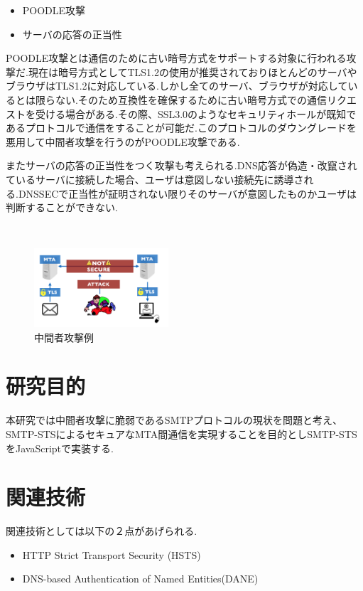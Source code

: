 \documentclass[a4j,10pt]{jsarticle}
\begin{document}
\begin{itemize}
\item POODLE攻撃 
\item サーバの応答の正当性
\end{itemize}

POODLE攻撃とは通信のために古い暗号方式をサポートする対象に行われる攻撃だ.現在は暗号方式としてTLS1.2の使用が推奨されておりほとんどのサーバやブラウザはTLS1.2に対応している.しかし全てのサーバ、ブラウザが対応しているとは限らない.そのため互換性を確保するために古い暗号方式での通信リクエストを受ける場合がある.その際、SSL3.0のようなセキュリティホールが既知であるプロトコルで通信をすることが可能だ.このプロトコルのダウングレードを悪用して中間者攻撃を行うのがPOODLE攻撃である.

またサーバの応答の正当性をつく攻撃も考えられる.DNS応答が偽造・改竄されているサーバに接続した場合、ユーザは意図しない接続先に誘導される.DNSSECで正当性が証明されない限りそのサーバが意図したものかユーザは判断することができない.

\begin{figure}[htbp]
　\begin{center}
      \includegraphics[width=5cm]{figure2.png}
      \caption{中間者攻撃例}
    \end{center}
\end{figure}


\section{研究目的}

本研究では中間者攻撃に脆弱であるSMTPプロトコルの現状を問題と考え、SMTP-STSによるセキュアなMTA間通信を実現することを目的としSMTP-STSをJavaScriptで実装する.



\section{関連技術}

関連技術としては以下の２点があげられる.
\begin{itemize}
\item HTTP Strict Transport Security (HSTS)
\item DNS-based Authentication of Named Entities(DANE)
\end{itemize}
\end{document}

